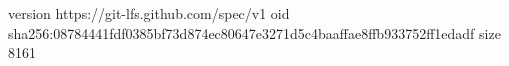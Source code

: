 version https://git-lfs.github.com/spec/v1
oid sha256:08784441fdf0385bf73d874ec80647e3271d5c4baaffae8ffb933752ff1edadf
size 8161
